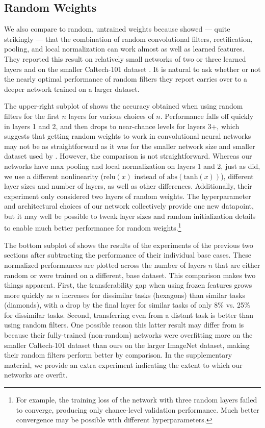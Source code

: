 \subsection{Random Weights}

We also compare to random, untrained weights because \cite{Jarrett-ICCV2009} showed --- quite strikingly --- that the combination of random convolutional filters, rectification, pooling, and local normalization can work almost as well as learned features. They reported this result on relatively small networks of two or three learned layers and on the smaller Caltech-101 dataset \citep{Fei-Fei.2004}. It is natural to ask whether or not the nearly optimal performance of random filters they report carries over to a deeper network trained on a larger dataset.

The upper-right subplot of  shows the accuracy obtained when using random filters for the first $n$ layers for various choices of $n$. Performance falls off quickly in layers 1 and 2, and then drops to near-chance levels for layers 3+, which suggests that getting random weights to work in convolutional neural networks may not be as straightforward as it was for the smaller network size and smaller dataset used by \cite{Jarrett-ICCV2009}. However, the comparison is not straightforward. Whereas our networks have max pooling and local normalization on layers 1 and 2, just as \cite{Jarrett-ICCV2009} did, we use a different nonlinearity ($\mathrm{relu}(x)$ instead of $\mathrm{abs}(\mathrm{tanh}(x))$), different layer sizes and number of layers, as well as other differences. Additionally, their experiment only considered two layers of random weights. The hyperparameter and architectural choices of our network collectively provide one new datapoint, but it may well be possible to tweak layer sizes and random initialization details to enable much better performance for random weights.\footnote{For example, the training loss of the network with three random layers failed to converge, producing only chance-level validation performance. Much better convergence may be possible with different hyperparameters.}

The bottom subplot of  shows the results of the experiments of the previous two sections after subtracting the performance of their individual base cases. These normalized performances are plotted across the number of layers $n$ that are either random or were trained on a different, base dataset. This comparison makes two things apparent. First, the transferability gap when using frozen features grows more quickly as $n$ increases for dissimilar tasks (hexagons) than similar tasks (diamonds), with a drop by the final layer for similar tasks of only 8\% vs. 25\% for dissimilar tasks. Second, transferring even from a distant task is better than using random filters. One possible reason this latter result may differ from \cite{Jarrett-ICCV2009} is because their fully-trained (non-random) networks were overfitting more on the smaller Caltech-101 dataset than ours on the larger ImageNet dataset, making their random filters perform better by comparison. In the supplementary material, we provide an extra experiment indicating the extent to which our networks are overfit.

